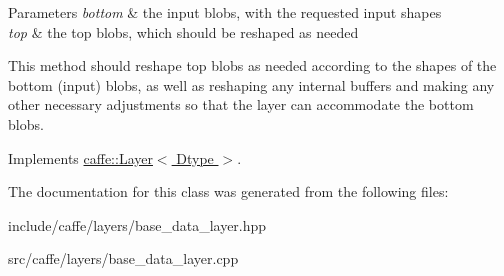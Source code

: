 \begin{DoxyParams}{Parameters}
{\em bottom} & the input blobs, with the requested input shapes \\
\hline
{\em top} & the top blobs, which should be reshaped as needed\\
\hline
\end{DoxyParams}
This method should reshape top blobs as needed according to the shapes of the bottom (input) blobs, as well as reshaping any internal buffers and making any other necessary adjustments so that the layer can accommodate the bottom blobs. 

Implements \hyperlink{classcaffe_1_1Layer_ad9d391b972c769c0ebee34ca6d1c973e}{caffe\+::\+Layer$<$ Dtype $>$}.



The documentation for this class was generated from the following files\+:\begin{DoxyCompactItemize}
\item 
include/caffe/layers/base\+\_\+data\+\_\+layer.\+hpp\item 
src/caffe/layers/base\+\_\+data\+\_\+layer.\+cpp\end{DoxyCompactItemize}
